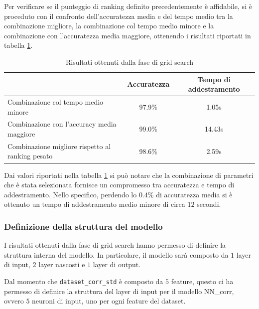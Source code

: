 Per verificare se il punteggio di ranking definito precedentemente è affidabile, 
si è proceduto con il confronto dell'accuratezza media e del tempo medio tra la combinazione
migliore, la combinazione col tempo medio minore e la combinazione con l'accuratezza 
media maggiore, ottenendo i risultati riportati in tabella \ref{tab:ris-grid-search}.
\begin{table}[ht]
    \centering
    \begin{tabular}{@{}lcc@{}}
        \toprule
        \rowcolor[HTML]{EFEFEF}
        \multicolumn{1}{c}{\cellcolor[HTML]{EFEFEF}\textbf{Combinazione di parametri}} & \textbf{Accuratezza} & \textbf{Tempo di addestramento} \\ \midrule
        Combinazione col tempo medio minore                                & 97.9\%               & 1.05s                           \\
        Combinazione con l'accuracy media maggiore                                         & 99.0\%               & 14.43s                          \\
        Combinazione migliore rispetto al ranking pesato                                               & 98.6\%               & 2.59s                           \\ \bottomrule
    \end{tabular}
    \caption{Risultati ottenuti dalla fase di grid search}
    \label{tab:ris-grid-search}
\end{table}

Dai valori riportati nella tabella \ref{tab:ris-grid-search} si può notare che 
la combinazione di parametri  che è stata selezionata fornisce un compromesso tra
accuratezza e tempo di addestramento. Nello specifico, perdendo lo $0.4\%$ di
accuratezza media si è ottenuto un tempo di addestramento medio minore di circa $12$ secondi.

\subsubsection{Definizione della struttura del modello}

I risultati ottenuti dalla fase di grid search hanno permesso di definire la
struttura interna del modello. In particolare, il modello sarà composto da $1$
layer di input, $2$ layer nascosti e $1$ layer di output.

Dal momento che \texttt{dataset\_corr\_std} è composto da $5$ feature, questo ci ha permesso 
di definire la struttura del layer di input per il modello NN\_corr, ovvero
$5$ neuroni di input, uno per ogni feature del dataset.

